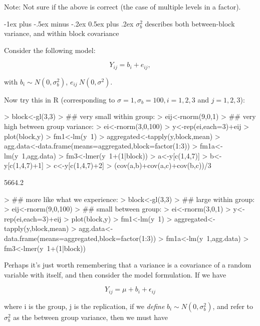 \documentclass[10pt,landscape]{article}
\makeatletter
\renewcommand{\section}{\@startsection{section}{1}{0mm}%
                                {-1ex plus -.5ex minus -.2ex}%
                                {0.5ex plus .2ex}%
                                {\normalfont\large\bfseries}}
\makeatother
\begin{document}
\begin{multicols}{3}
Note: Not sure if the above is correct (the case of multiple levels in a factor).

\section{$\sigma_b^2$ describes both between-block variance, and within block covariance}

Consider the following model:

\begin{equation}
Y_{ij} = b_i + e_{ij},
\end{equation}


with $b_i\sim N(0,\sigma^2_b)$, $e_{ij}~N(0,\sigma^2)$.

Now try this in R (corresponding to $\sigma=1, \sigma_b=100, i=1,2,3$ and $j=1,2,3$):

\begin{Schunk}
\begin{Sinput}
> block<-gl(3,3)
> ## very small within group:
> eij<-rnorm(9,0,1)
> ## very high between group variance:
> ei<-rnorm(3,0,100)
> y<-rep(ei,each=3)+eij
> plot(block,y)
> fm1<-lm(y~1)
> aggregated<-tapply(y,block,mean)
> agg.data<-data.frame(means=aggregated,block=factor(1:3))
> fm1a<-lm(y~1,agg.data)
> fm3<-lmer(y~1+(1|block))
> a<-y[c(1,4,7)]
> b<-y[c(1,4,7)+1]
> c<-y[c(1,4,7)+2]
> (cov(a,b)+cov(a,c)+cov(b,c))/3
\end{Sinput}
\begin{Soutput}
[1] 5664.2
\end{Soutput}
\begin{Sinput}
> ## more like what we experience:
> block<-gl(3,3)
> ## large within group:
> eij<-rnorm(9,0,100)
> ## small between group:
> ei<-rnorm(3,0,1)
> y<-rep(ei,each=3)+eij
> plot(block,y)
> fm1<-lm(y~1)
> aggregated<-tapply(y,block,mean)
> agg.data<-data.frame(means=aggregated,block=factor(1:3))
> fm1a<-lm(y~1,agg.data)
> fm3<-lmer(y~1+(1|block))
\end{Sinput}
\end{Schunk}

Perhaps it's just worth remembering that a variance is a covariance of a random variable with itself, and then consider the model formulation. If we have

\begin{equation}
Y_{ij} = \mu + b_i + \epsilon_{ij}
\end{equation}

where i is the group, j is the replication, if we \textit{define} $b_i\sim N(0, \sigma^2_b)$, and refer to $\sigma^2_b$ as the between group variance, then we must have



\end{multicols}
\end{document}
